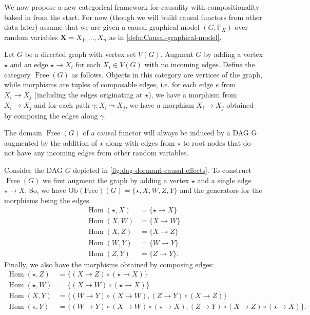 \documentclass[../main.tex]{subfiles}
\begin{document}
    We now propose a new categorical framework for causality with compositionality baked in from the start. For now (though we will build causal functors from other data later) assume that we are given a causal graphical model ${(G, \mathbb{P}_X)}$ over random variables ${\mathbf{X} = X_1,\dots,X_n}$   as in \autoref{defn:Causal-graphical-model}. 
    \begin{defn}\label{defn:Free-category-over-a-directed-graph}
     Let $G$ be a directed graph with vertex set $V(G)$. Augment $G$ by adding a vertex $\star$ and an edge $\star \to X_i$ for each $X_i \in V(G)$ with no incoming edges.  Define the category $\operatorname{Free}(G)$ as follows. Objects in this category are vertices of the graph, while morphisms are tuples of composable edges, i.e. for each edge $e$ from ${X_i \to X_j}$  (including the edges originating at ${\star}$), we have a morphism from ${X_i \to X_j}$ and for each path ${\gamma : X_i \leadsto X_j}$, we have a morphism ${X_i \to X_j}$ obtained by composing the edges along ${\gamma}$.  
    \end{defn}
    \begin{nota}
        The domain ${\operatorname{Free}(G)}$ of a causal functor will always be induced by a DAG G augmented by the addition of ${\star}$ along with edges from ${\star}$ to root nodes that do not have any incoming edges from other random variables. 
    \end{nota}
    \begin{ex}\label{ex:Free-category-on-the-diamond-DAG}
        Consider the DAG $G$ depicted in \autoref{fig:dag-dormant-causal-effects}. To construct ${\operatorname{Free}(G)}$ we first augment the graph by adding a vertex ${\star}$ and a single edge ${\star \to X}$. So, we have ${\operatorname{Ob(Free)}(G) = \{\star, X, W, Z, Y\}}$ and the generators for the morphisms being the edges 
        \begin{align*}
            \operatorname{Hom}(\star, X) &= \{\star \to X\}\\
            \operatorname{Hom}(X, W) &= \{X\to W\}\\
            \operatorname{Hom}(X, Z) &= \{X\to Z\}\\
            \operatorname{Hom}(W,Y) &= \{W\to Y\}\\
            \operatorname{Hom}(Z,Y) &= \{Z\to Y\}.
        \end{align*} 
        Finally, we also have the morphisms obtained by composing edges:
        \begin{align*}
            \operatorname{Hom}(\star, Z) &= \{(X\to Z)\circ (\star \to X)\}\\
            \operatorname{Hom}(\star, W) &= \{(X\to W)\circ (\star \to X)\}\\
            \operatorname{Hom}(X, Y) &= \{(W\to Y)\circ(X\to W), (Z\to Y)\circ(X\to Z)\}\\
            \operatorname{Hom}(\star, Y) &= \{(W\to Y)\circ(X\to W)\circ(\star \to X), (Z\to Y)\circ(X\to Z)\circ (\star \to X)\}.
        \end{align*}
    \end{ex}
\end{document}
